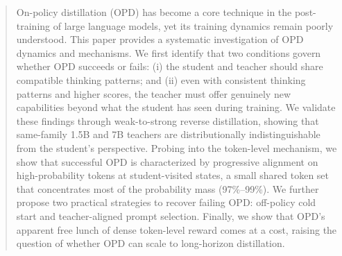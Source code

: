 \begin{abstract}
On-policy distillation (OPD) has become a core technique in the post-training of large language models, yet its training dynamics remain poorly understood.
This paper provides a systematic investigation of OPD dynamics and mechanisms.
We first identify that two conditions govern whether OPD succeeds or fails: (i) the student and teacher should share compatible thinking patterns;
and (ii) even with consistent thinking patterns and higher scores, the teacher must offer genuinely new capabilities beyond what the student has seen during training.
We validate these findings through weak-to-strong reverse distillation, showing that same-family 1.5B and 7B teachers are distributionally indistinguishable from the student’s perspective.
Probing into the token-level mechanism, we show that successful OPD is characterized by progressive alignment on high-probability tokens at student-visited states, a small shared token set that concentrates most of the probability mass (97\%--99\%).
We further propose two practical strategies to recover failing OPD: off-policy cold start and teacher-aligned prompt selection.
Finally, we show that OPD's apparent free lunch of dense token-level reward comes at a cost, raising the question of whether OPD can scale to long-horizon distillation.

\end{abstract}
